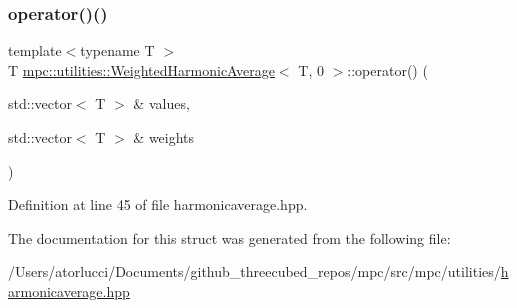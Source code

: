 \subsubsection{\texorpdfstring{operator()()}{operator()()}}
{\footnotesize\ttfamily template$<$typename T $>$ \\
T \mbox{\hyperlink{structmpc_1_1utilities_1_1_weighted_harmonic_average}{mpc\+::utilities\+::\+Weighted\+Harmonic\+Average}}$<$ T, 0 $>$\+::operator() (\begin{DoxyParamCaption}\item[{std\+::vector$<$ T $>$ \&}]{values,  }\item[{std\+::vector$<$ T $>$ \&}]{weights }\end{DoxyParamCaption})\hspace{0.3cm}{\ttfamily [inline]}}



Definition at line 45 of file harmonicaverage.\+hpp.



The documentation for this struct was generated from the following file\+:\begin{DoxyCompactItemize}
\item 
/\+Users/atorlucci/\+Documents/github\+\_\+threecubed\+\_\+repos/mpc/src/mpc/utilities/\mbox{\hyperlink{harmonicaverage_8hpp}{harmonicaverage.\+hpp}}\end{DoxyCompactItemize}

